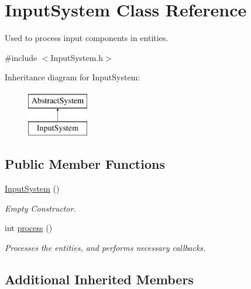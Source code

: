 \hypertarget{class_input_system}{\section{Input\-System Class Reference}
\label{da/dc2/class_input_system}
}


Used to process input components in entities.  




{\ttfamily \#include $<$Input\-System.\-h$>$}

Inheritance diagram for Input\-System\-:\begin{figure}[H]
\begin{center}
\leavevmode
\includegraphics[height=2.000000cm]{da/dc2/class_input_system}
\end{center}
\end{figure}
\subsection*{Public Member Functions}
\begin{DoxyCompactItemize}
\item 
\hypertarget{class_input_system_a2f18d9fdb44805c63984113c1433c223}{\hyperlink{class_input_system_a2f18d9fdb44805c63984113c1433c223}{Input\-System} ()}\label{da/dc2/class_input_system_a2f18d9fdb44805c63984113c1433c223}

\begin{DoxyCompactList}\small\item\em Empty Constructor. \end{DoxyCompactList}\item 
\hypertarget{class_input_system_a05c5413c337e228ef969d816fa6457a2}{int \hyperlink{class_input_system_a05c5413c337e228ef969d816fa6457a2}{process} ()}\label{da/dc2/class_input_system_a05c5413c337e228ef969d816fa6457a2}

\begin{DoxyCompactList}\small\item\em Processes the entities, and performs necessary callbacks. \end{DoxyCompactList}\end{DoxyCompactItemize}
\subsection*{Additional Inherited Members}


